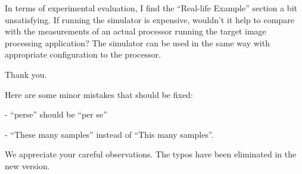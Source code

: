 \begin{reviewer}
In terms of experimental evaluation, I find the ``Real-life Example'' section a
bit unsatisfying. If running the simulator is expensive, wouldn't it help to
compare with the measurements of an actual processor running the target image
processing application? The simulator can be used in the same way with
appropriate configuration to the processor.
\end{reviewer}

\begin{authors}
Thank you.
\end{authors}

\begin{reviewer}
Here are some minor mistakes that should be fixed:

\noindent- ``perse'' should be ``per se''

\noindent- ``These many samples'' instead of ``This many samples''.
\end{reviewer}

\begin{authors}
We appreciate your careful observations. The typos have been eliminated in the
new version.

\begin{actions}
\end{actions}
\end{authors}
